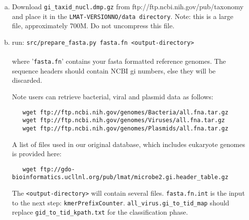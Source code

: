 \documentclass[11pt]{article}
\newcommand{\lmatver}{VERSIONNO}
\begin{document}
\begin{enumerate}[a)]
\item
Download \texttt{gi\_taxid\_nucl.dmp.gz} from ftp://ftp.ncbi.nih.gov/pub/taxonomy
   and place it in the \texttt{LMAT-\lmatver/data directory}. Note: this is a large file,
   approximately 700M. Do not uncompress this file.
\item
run: \texttt{src/prepare\_fasta.py fasta.fn <output-directory>}\\
\\
   where '\texttt{fasta.fn}' contains your fasta formatted reference genomes. 
   The sequence headers should contain NCBI gi numbers, else they
   will be discarded.

   Note users can retrieve bacterial, viral and plasmid data as follows:
\begin{verbatim}
   wget ftp://ftp.ncbi.nih.gov/genomes/Bacteria/all.fna.tar.gz
   wget ftp://ftp.ncbi.nih.gov/genomes/Viruses/all.fna.tar.gz
   wget ftp://ftp.ncbi.nih.gov/genomes/Plasmids/all.fna.tar.gz
\end{verbatim}

   A list of files used in our original database, which includes eukaryote genomes is provided here:

\begin{verbatim}
   wget ftp://gdo-bioinformatics.ucllnl.org/pub/lmat/microbe2.gi.header_table.gz
\end{verbatim}
 

   The \texttt{<output-directory>} will contain several files. \texttt{fasta.fn.int}
   is the input to the next step: \texttt{kmerPrefixCounter}.
   \texttt{all\_virus.gi\_to\_tid\_map} should replace \texttt{gid\_to\_tid\_kpath.txt}
   for the classification phase.
\end{enumerate}
\end{document}
